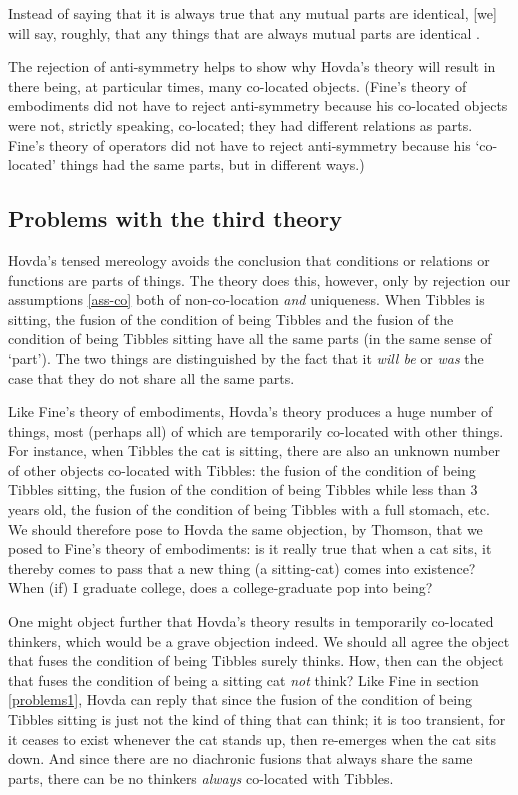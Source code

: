 \documentclass[11pt]{article}
\newenvironment{squote}{%
\begin{spacing}{1}
\begin{list}{}{%
\setlength{\labelwidth}{0pt}%
\rightmargin\leftmargin%
}
\item\relax
}{%
\end{list}%
\end{spacing}
}
\begin{document}
\begin{spacing}{1.5}
\begin{squote}
Instead of saying that it is always true that any mutual parts are
identical, [we] will say, roughly, that any things that are always
mutual parts are identical \citep[17]{hovda2011}.
\end{squote}

The rejection of anti-symmetry helps to show why Hovda's theory will
result in there being, at particular times, many co-located objects.
(Fine's theory of embodiments did not have to reject anti-symmetry
because his co-located objects were not, strictly speaking,
co-located; they had different relations as parts.  Fine's theory of
operators did not have to reject anti-symmetry because his
`co-located' things had the same parts, but in different ways.)

\subsection{Problems with the third theory}
\label{problems3}
Hovda's tensed mereology avoids the conclusion that conditions or
relations or functions are parts of things.  The theory does this,
however, only by rejection our assumptions \ref{ass-co} both of
non-co-location {\em and} uniqueness.  When Tibbles is sitting, the
fusion of the condition of being Tibbles and the fusion of the
condition of being Tibbles sitting have all the same parts (in the
same sense of `part').  The two things are distinguished by the fact
that it {\em will be} or {\em was} the case that they do not share all
the same parts.

Like Fine's theory of embodiments, Hovda's theory produces a huge
number of things, most (perhaps all) of which are temporarily
co-located with other things.  For instance, when Tibbles the cat is
sitting, there are also an unknown number of other objects co-located
with Tibbles: the fusion of the condition of being Tibbles sitting,
the fusion of the condition of being Tibbles while less than 3 years
old, the fusion of the condition of being Tibbles with a full stomach,
etc.  We should therefore pose to Hovda the same objection, by
Thomson, that we posed to Fine's theory of embodiments: is it really
true that when a cat sits, it thereby comes to pass that a new thing
(a sitting-cat) comes into existence?  When (if) I graduate college,
does a college-graduate pop into being?

One might object further that Hovda's theory results in temporarily
co-located thinkers, which would be a grave objection indeed.  We
should all agree the object that fuses the condition of being Tibbles
surely thinks.  How, then can the object that fuses the condition of
being a sitting cat {\em not} think?  Like Fine in section
\ref{problems1}, Hovda can reply that since the fusion of the
condition of being Tibbles sitting is just not the kind of thing that
can think; it is too transient, for it ceases to exist whenever the
cat stands up, then re-emerges when the cat sits down.  And since
there are no diachronic fusions that always share the same parts,
there can be no thinkers {\em always} co-located with Tibbles.


\end{spacing}
\end{document}
